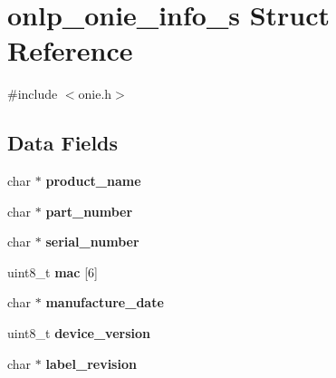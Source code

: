 \hypertarget{structonlp__onie__info__s}{\section{onlp\+\_\+onie\+\_\+info\+\_\+s Struct Reference}
\label{structonlp__onie__info__s}
}


{\ttfamily \#include $<$onie.\+h$>$}

\subsection*{Data Fields}
\begin{DoxyCompactItemize}
\item 
\hypertarget{structonlp__onie__info__s_a40579fc6acf97c77f0d5d12afe265837}{char $\ast$ {\bfseries product\+\_\+name}}\label{structonlp__onie__info__s_a40579fc6acf97c77f0d5d12afe265837}

\item 
\hypertarget{structonlp__onie__info__s_a6550c1a1853c8c1b46589ca1eb839992}{char $\ast$ {\bfseries part\+\_\+number}}\label{structonlp__onie__info__s_a6550c1a1853c8c1b46589ca1eb839992}

\item 
\hypertarget{structonlp__onie__info__s_a1156fad73134a5f89e8aad4e57eac2e0}{char $\ast$ {\bfseries serial\+\_\+number}}\label{structonlp__onie__info__s_a1156fad73134a5f89e8aad4e57eac2e0}

\item 
\hypertarget{structonlp__onie__info__s_a52b0c3c4876862dcfd12e42c82500c86}{uint8\+\_\+t {\bfseries mac} \mbox{[}6\mbox{]}}\label{structonlp__onie__info__s_a52b0c3c4876862dcfd12e42c82500c86}

\item 
\hypertarget{structonlp__onie__info__s_a85f30f85b5db9f96b99b2b80808c6712}{char $\ast$ {\bfseries manufacture\+\_\+date}}\label{structonlp__onie__info__s_a85f30f85b5db9f96b99b2b80808c6712}

\item 
\hypertarget{structonlp__onie__info__s_a6f78bd36c289903aead2d3795b9b6201}{uint8\+\_\+t {\bfseries device\+\_\+version}}\label{structonlp__onie__info__s_a6f78bd36c289903aead2d3795b9b6201}

\item 
\hypertarget{structonlp__onie__info__s_aa893900a2b26a447e47b5849ca1d173a}{char $\ast$ {\bfseries label\+\_\+revision}}\label{structonlp__onie__info__s_aa893900a2b26a447e47b5849ca1d173a}


\end{DoxyCompactItemize}
